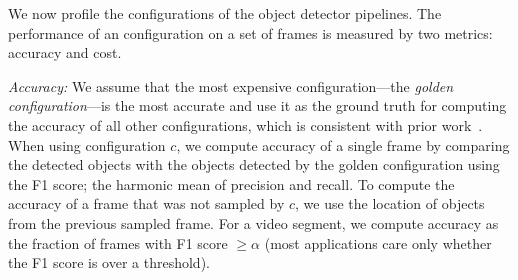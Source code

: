 We now profile the configurations of the object detector pipelines. 
The performance of an configuration on a set of frames is 
measured by two metrics: accuracy and cost. 
\begin{packeditemize}
\item {\em Accuracy:} 
We assume that the most expensive configuration---\ie the \emph{golden configuration}---is the most accurate and use it as the ground truth for computing the accuracy of all other configurations, which is consistent with prior work~\cite{videostar,noscope}.
When using configuration $c$, we compute accuracy of a single frame by comparing the detected objects with the objects detected by the golden configuration using the F1 score; \ie the harmonic mean of precision and recall. To compute the accuracy of a frame that was not sampled by $c$, we use the location of objects from the previous sampled frame. 
For a video segment, we compute accuracy as the fraction of frames with F1 score $\geq \alpha$ (most applications care only whether the F1 score is over a threshold).




\end{packeditemize}
